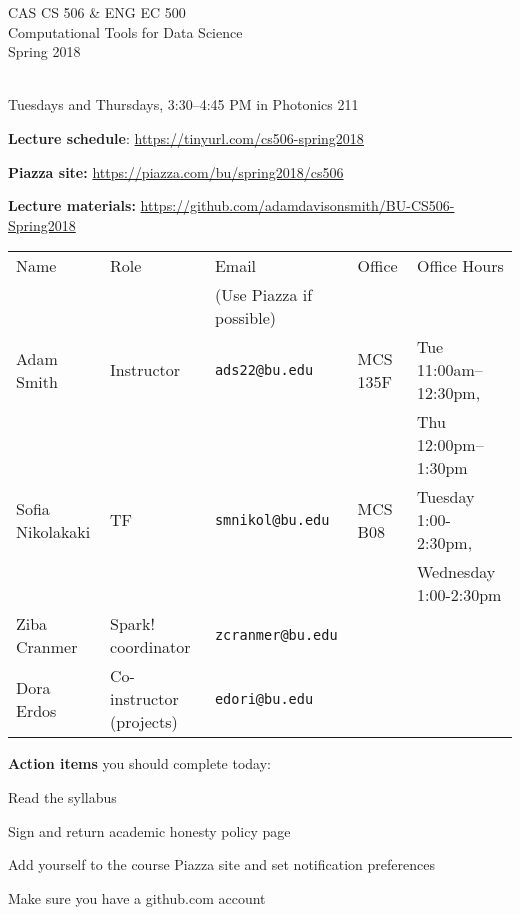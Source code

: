 \documentclass[11pt]{article}
\begin{document}

\begin{center}
\LARGE CAS CS 506 \& ENG EC 500\\
\Large Computational Tools for Data Science\\
\Large\rm Spring 2018\\~\\
\end{center}

 Tuesdays and Thursdays, 3:30--4:45
PM in Photonics 211

\noindent \textbf{Lecture schedule}: 
\url{https://tinyurl.com/cs506-spring2018}

\noindent \textbf{Piazza site:} \url{https://piazza.com/bu/spring2018/cs506}

\noindent \textbf{Lecture materials:} \url{https://github.com/adamdavisonsmith/BU-CS506-Spring2018}

\medskip
\noindent
\begin{small}
  \begin{tabular}{|l|l|l|l|l|}
    \hline
    Name & Role & Email & Office & Office Hours\\
         & & (Use Piazza if possible) & &  \\
    \hline
    \hline
    Adam Smith & Instructor & \texttt{ads22@bu.edu}
                        & MCS 135F & Tue 11:00am--12:30pm, \\
         & & & & Thu
                 12:00pm--1:30pm \\
    \hline
    Sofia Nikolakaki & TF & \texttt{smnikol@bu.edu} & MCS B08 & 
                                                                Tuesday 1:00-2:30pm, \\
         & & & & Wednesday 1:00-2:30pm \\
    \hline
    Ziba Cranmer & Spark! coordinator & \texttt{zcranmer@bu.edu}& & \\
    \hline
    Dora Erdos & Co-instructor (projects) & \texttt{edori@bu.edu} &
                                 & \\
    \hline 
  \end{tabular}
\end{small}


\medskip


\noindent \textbf{Action items} you should complete today:
\begin{compactitem}
\item Read the syllabus
\item Sign and return academic honesty policy page
\item Add yourself to the course Piazza site and set notification preferences
\item Make sure you have a github.com account 
\end{compactitem}
\end{document}
